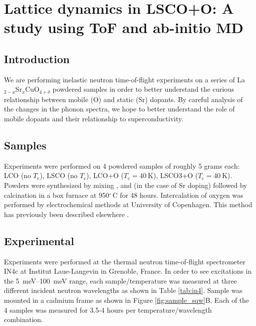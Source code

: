 \chapter{Lattice dynamics in LSCO+O: A study using ToF and ab-initio MD}

\section{Introduction}
We are performing inelastic neutron time-of-flight experiments on a series of La$_{2-x}$Sr$_{x}$CuO$_{4+\delta}$ powdered samples in order to better understand the curious relationship between mobile (O) and static (Sr) dopants. By careful analysis of the changes in the phonon spectra, we hope to better understand the role of mobile dopants and their relationship to superconductivity.

\section{Samples}
Experiments were performed on 4 powdered samples of roughly 5 grams each: LCO (no $T_\text{c}$), LSCO (no $T_\text{c}$), LCO+O ($T_\text{c} = \SI{40}{\kelvin}$), LSCO3+O ($T_\text{c} = \SI{40}{\kelvin}$). Powders were synthesized by mixing ,  and (in the case of Sr doping)  followed by calcination in a box furnace at 950$^\circ \, \text{C}$ for 48 hours. Intercalation of oxygen was performed by electrochemical methods at University of Copenhagen. This method has previously been described elsewhere \cite{Blakeslee1998}.

\section{Experimental}
Experiments were performed at the thermal neutron time-of-flight spectrometer IN4c at Institut Laue-Langevin in Grenoble, France. In order to see excitations in the \SIrange{5}{100}{\milli\eV} range, each sample/temperature was measured at three different incident neutron wavelengths as shown in Table \ref{tab:in4}. Sample was mounted in a cadmium frame as shown in Figure \ref{fig:sample_sqw}B. Each of the 4 samples was measured for 3.5-4 hours per temperature/wavelength combination. 

